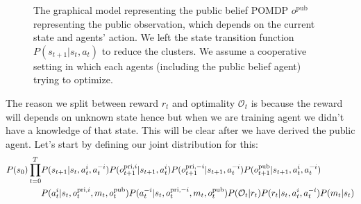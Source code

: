 \begin{figure}[h]
\begin{minipage}[t]{0.5\linewidth}
    \end{minipage}%
    \begin{minipage}[t]{0.5\linewidth}
    \caption{The graphical model representing the public belief POMDP $o^{\operatorname{pub}}$ representing the public observation, which depends on the current state and agents' action. We left the state transition function $P(s_{t+1} | s_t, a_t)$ to reduce the clusters. We assume a cooperative setting in which each agents (including the public belief agent) trying to optimize. }
    \label{fig:chap4-public-belief-MARL}
    \end{minipage}
\end{figure}
The reason we split between reward $r_t$ and optimality $\mathcal{O}_t$ is because the reward will depends on unknown state hence but when we are training agent we didn't have a knowledge of that state. This will be clear after we have derived the public agent. Let's start by defining our joint distribution for this:
\begin{equation}
\label{eqn:elbo-pub-belief}
\begin{aligned}
    P(s_0)  \prod^T_{t=0} &P(s_{t+1} | s_t, a_t^i, a_t^{-i}) P(o^{\operatorname{pri}, i}_{t+1} | s_{t+1}, a^i_t) P(o^{\operatorname{pri}, -i}_{t+1} | s_{t+1}, a^{-i}_t) P(o^{\operatorname{pub}}_{t+1} | s_{t+1}, a^i_t, a^{-i}_t) \\
    &P(a^i_t | s_t, o^{\operatorname{pri}, i}_t, m_t, o^{\operatorname{pub}}_t) P(a^{-i}_t | s_t, o^{\operatorname{pri}, -i}_t, m_t, o^{\operatorname{pub}}_t) P(\mathcal{O}_t| r_t) P(r_t | s_t, a^i_t, a^{-i}_t) P(m_t | s_t)
\end{aligned}
\end{equation}
